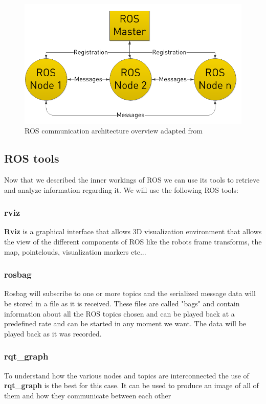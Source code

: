 \begin{figure}[ht!] 
\centerline{\includegraphics [width=0.6 \textwidth]{imgs/chapter3/rosgraph2.png}}
\caption[ROS communication architecture overview]{ROS communication architecture overview adapted from \cite{rosbasics}}
\label{fig:rosgraph}
\end{figure}


\subsection{ROS tools}
Now that we described the inner workings of \ac{ROS} we can use its tools to retrieve and analyze information regarding it. We will use the following \ac{ROS} tools:
\subsubsection{rviz}
\textbf{Rviz} is a graphical interface that allows 3D visualization environment that allows the view of the different components of \ac{ROS} like the robots frame transforms, the map, pointclouds, visualization markers etc...
\subsubsection{rosbag}
 Rosbag will subscribe to one or more topics and the serialized message data will be stored in a file as it is received. These files are called "bags" and contain information about all the \ac{ROS} topics chosen and can be played back at a predefined rate and can be started in any moment we want. The data will be played back as it was recorded.
\subsubsection{rqt_graph}
To understand how the various nodes and topics are interconnected the use of \textbf{rqt_graph} is the best for this case. It can be used to produce an image of all of them and how they communicate between each other
